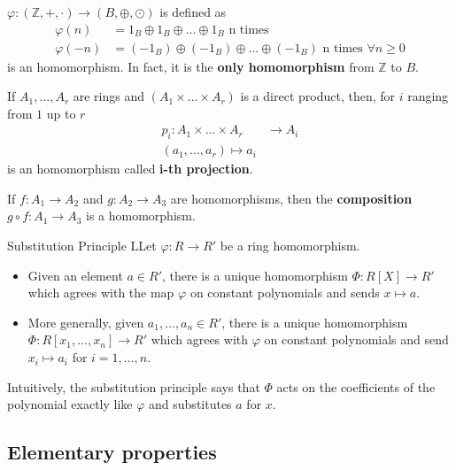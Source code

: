 \documentclass[12pt,a4paper]{article}
\begin{document}
$\varphi: (\mathbb{Z},+,\cdot) \to (B,\oplus,\odot)$ is defined as
\begin{equation*}
\begin{aligned}
\varphi(n) & = 1_B \oplus 1_B \oplus \ldots \oplus 1_B \text{ n times }\\
\varphi (-n) & = (-1_B) \oplus (-1_B) \oplus \ldots \oplus (-1_B) \text{ n times } \forall n \geq 0
\end{aligned}
\end{equation*}
is an homomorphism. In fact, it is the \textbf{only homomorphism} from $\mathbb{Z}$ to $B$.

If $A_1, \ldots, A_r$ are rings and $(A_1 \times \ldots \times A_r)$ is a direct product, then, for $i$ ranging from $1$ up to $r$
\begin{equation*}
\begin{aligned}
p_i : A_1 \times \ldots \times A_r & \to A_i \\
(a_1, \ldots, a_r) \mapsto a_i
\end{aligned}
\end{equation*}
is an homomorphism called \textbf{i-th projection}.

If $f:A_1 \to A_2$ and $g:A_2 \to A_3$ are homomorphisms, then the \textbf{composition} $g \circ f : A_1 \to A_3$ is a homomorphism.

\begin{thm}{Substitution Principle}
LLet $\varphi : R \to R'$ be a ring homomorphism. 
\begin{itemize}
\item Given an element $a \in R'$, there is a unique homomorphism $\Phi : R[X] \to R'$ which agrees with the map $\varphi$ on constant polynomials and sends $x \mapsto a$.
\item More generally, given $a_1, \ldots, a_n \in R'$, there is a unique homomorphism $\Phi : R[x_1,\ldots,x_n] \to R'$ which agrees with $\varphi$ on constant polynomials and send $x_i \mapsto a_i$ for $i=1,\ldots,n$.
\end{itemize}
\end{thm}

Intuitively, the substitution principle says that $\Phi$ acts on the coefficients of the polynomial exactly like $\varphi$ and substitutes $a$ for $x$.

\subsection{Elementary properties}
\end{document}
